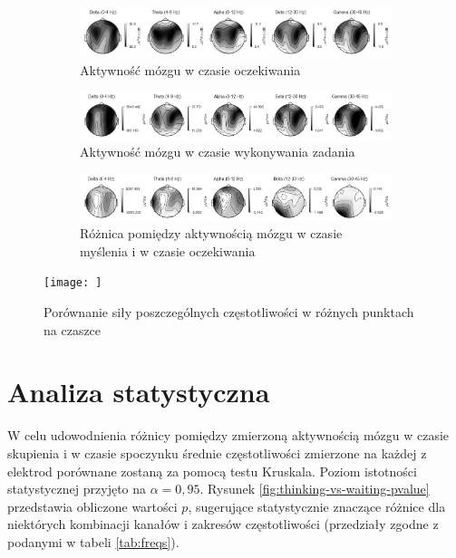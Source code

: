 \documentclass{./assets/wfis}
\begin{document}
\begin{figure}[h!]
    \centering
    \begin{subfigure}[b]{\textwidth}
    \centering
    \includegraphics[width=\columnwidth]{thesis/assets/waiting.png}
    \caption{Aktywność mózgu w czasie oczekiwania}
    \label{fig:waiting}
\end{subfigure}


\begin{subfigure}[b]{\textwidth}
    \centering
    \includegraphics[width=\columnwidth]{thesis/assets/thinking.png}
    \caption{Aktywność mózgu w czasie wykonywania zadania}
    \label{fig:thinking}
\end{subfigure}


\begin{subfigure}[b]{\textwidth}
    \centering
    \includegraphics[width=\columnwidth]{thesis/assets/diff.png}
    \caption{Różnica pomiędzy aktywnością mózgu w czasie myślenia i w czasie oczekiwania}
    \label{fig:diff}
\end{subfigure}
    \texttt{[image: ]}
    \caption{Porównanie siły poszczególnych częstotliwości w różnych punktach na czaszce}
    \label{fig:brain-heatmaps}
\end{figure}

\section{Analiza statystyczna}\label{analiza-klasyczna}
W celu udowodnienia różnicy pomiędzy zmierzoną aktywnością mózgu w czasie skupienia i w czasie spoczynku średnie częstotliwości zmierzone na każdej z elektrod porównane zostaną za pomocą testu Kruskala. Poziom istotności statystycznej przyjęto na $\alpha=0,95$. Rysunek \ref{fig:thinking-vs-waiting-pvalue} przedstawia obliczone wartości $p$, sugerujące statystycznie znaczące różnice dla niektórych kombinacji kanałów i zakresów częstotliwości (przedziały zgodne z podanymi w tabeli \ref{tab:freqs}).
\end{document}
